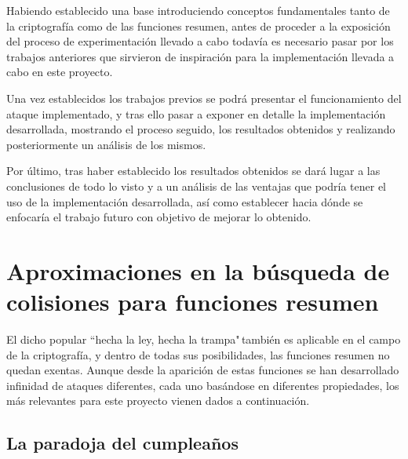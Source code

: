 \documentclass[12pt,spanish,listoffigures,listoftables]{tfgetsinf}
\begin{document}
Habiendo establecido una base introduciendo conceptos fundamentales tanto de la criptografía como de las funciones resumen, antes de proceder a la exposición del proceso de experimentación llevado a cabo todavía es necesario pasar por los trabajos anteriores que sirvieron de inspiración para la implementación llevada a cabo en este proyecto.

Una vez establecidos los trabajos previos se podrá presentar el funcionamiento del ataque implementado, y tras ello pasar a exponer en detalle la implementación desarrollada, mostrando el proceso seguido, los resultados obtenidos y realizando posteriormente un análisis de los mismos.

Por último, tras haber establecido los resultados obtenidos se dará lugar a las conclusiones de todo lo visto y a un análisis de las ventajas que podría tener el uso de la implementación desarrollada, así como establecer hacia dónde se enfocaría el trabajo futuro con objetivo de mejorar lo obtenido.




\chapter{Aproximaciones en la búsqueda de colisiones para funciones resumen}

El dicho popular ``hecha la ley, hecha la trampa"\,también es aplicable en el campo de la criptografía, y dentro de todas sus posibilidades, las funciones resumen no quedan exentas. Aunque desde la aparición de estas funciones se han desarrollado infinidad de ataques diferentes, cada uno basándose en diferentes propiedades, los más relevantes para este proyecto vienen dados a continuación.

\section{La paradoja del cumpleaños}
\end{document}

